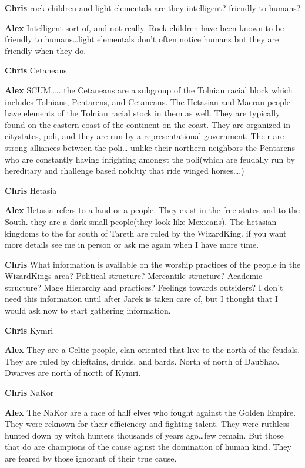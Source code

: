 {\bf Chris}
rock children and light elementals are they intelligent? friendly to humans?

{\bf Alex }	
Intelligent sort of, and not really. Rock children have been known to be 
friendly to humans\dots light elementals don't often notice humans but they 
are friendly when they do.

{\bf Chris}
Cetaneans

{\bf Alex }	
SCUM\dots.. the Cetaneans are a sub\-group of the Tolnian racial block which 
includes Tolnians, Pentarens, and Cetaneans. The Hetasian and Maeran people 
have elements of the Tolnian racial stock in them as well.
They are typically found on the eastern coast of the continent on the coast. 
They are organized in city\-states, poli, and they are run by a 
representational government. Their are strong alliances between the poli\dots 
unlike their northern neighbors the Pentarens who are constantly having infighting 
amongst the poli(which are feudally run by hereditary and challenge based 
nobiltiy that ride winged horses\dots.)

{\bf Chris}
Hetasia

{\bf Alex }	
Hetasia refers to a land or a people. They exist in the free states and to 
the South. they are a dark small people(they look like Mexicans). The hetasian 
kingdoms to the far south of Tareth are ruled by the Wizard\-King. if 
you want more details see me in person or ask me again when I have more time.

{\bf Chris}
What information is available on the worship practices of the people in the Wizard\-Kings area? Political structure? Mercantile structure? Academic structure? Mage Hierarchy and practices? Feelings towards outsiders? I don't need this information until after Jarek is taken care of, but I thought that I would ask now to start gathering information.

{\bf Chris}
Kymri

{\bf Alex }	
They are a Celtic people, clan oriented that live to the north of the feudals. 
They are ruled by chieftains, druids, and bards. North of north of Dau\-Shao. 
Dwarves are north of north of Kymri.

{\bf Chris}
Na\-Kor

{\bf Alex }	
The Na\-Kor are a race of half elves who fought against the Golden Empire. They 
were reknown for their efficiencey and fighting talent. They were ruthless hunted 
down by witch hunters thousands of years ago\dots few remain. But those that 
do are champions of the cause aginst the domination of human kind. They are 
feared by those ignorant of their true cause.

